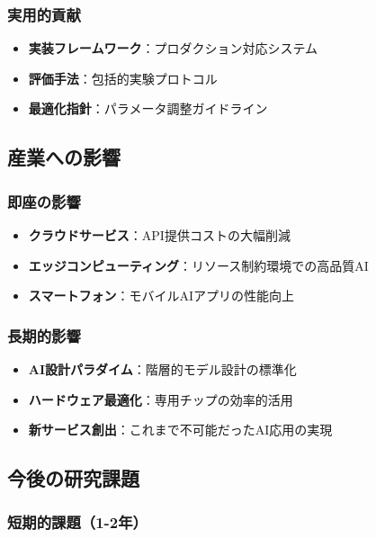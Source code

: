 \documentclass[a4paper,12pt]{jsarticle}
\begin{document}
\subsubsection{実用的貢献}

\begin{itemize}
\item \textbf{実装フレームワーク}：プロダクション対応システム
\item \textbf{評価手法}：包括的実験プロトコル
\item \textbf{最適化指針}：パラメータ調整ガイドライン
\end{itemize}

\subsection{産業への影響}

\subsubsection{即座の影響}

\begin{itemize}
\item \textbf{クラウドサービス}：API提供コストの大幅削減
\item \textbf{エッジコンピューティング}：リソース制約環境での高品質AI
\item \textbf{スマートフォン}：モバイルAIアプリの性能向上
\end{itemize}

\subsubsection{長期的影響}

\begin{itemize}
\item \textbf{AI設計パラダイム}：階層的モデル設計の標準化
\item \textbf{ハードウェア最適化}：専用チップの効率的活用
\item \textbf{新サービス創出}：これまで不可能だったAI応用の実現
\end{itemize}

\subsection{今後の研究課題}

\subsubsection{短期的課題（1-2年）}
\end{document}
